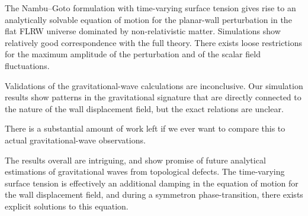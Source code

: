 








The Nambu--Goto formulation with time-varying surface tension gives rise to an analytically solvable equation of motion for the planar-wall perturbation in the flat FLRW universe dominated by non-relativistic matter. Simulations show relatively good correspondence with the full theory. There exists loose restrictions for the maximum amplitude of the perturbation and of the scalar field fluctuations. 

Validations of the gravitational-wave calculations are inconclusive. Our simulation results show patterns in the gravitational signature that are directly connected to the nature of the wall displacement field, but the exact relations are unclear. 

There is a substantial amount of work left if we ever want to compare this to actual gravitational-wave observations.


The results overall are intriguing, and show promise of future analytical estimations of gravitational waves from topological defects. The time-varying surface tension is effectively an additional damping in the equation of motion for the wall displacement field, and during a symmetron phase-transition, there exists explicit solutions to this equation.








